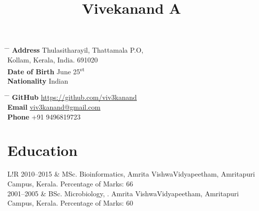 \documentclass[a4paper, 10pt]{article}
\date{\vspace{-10ex}}
\newcommand\VRule{\color{lightgray}\vrule width 0.5pt}
\begin{document}
\title{\vspace{-12ex}Vivekanand A}

\maketitle

\parbox[t]{0.5\textwidth}{
\begin{tabbing}
\hspace{3cm} \= \hspace{4cm} \= \kill
{\bf Address} \> Thulasitharayil, Thattamala P.O,\\
\> Kollam, Kerala, India. 691020 \\
{\bf Date of Birth}  June 25\textsuperscript{st} \\
{\bf Nationality} \> Indian \\
\end{tabbing}
}
\hfil
\parbox[t]{0.5\textwidth}{
\begin{tabbing}
\hspace{2cm} \= \hspace{4cm} \= \kill
{\bf GitHub} \> \href{https://github.com/viv3kanand}{https://github.com/viv3kanand} \\
{\bf Email} \> \href{mailto:viv3kanand@gmail.com}{viv3kanand@gmail.com} \\
{\bf Phone} \> +91 9496819723
\end{tabbing}
}



\section*{Education}
\begin{tabular}{L!{\VRule}R}
   2010--2015 & MSc. Bioinformatics, Amrita VishwaVidyapeetham, Amritapuri Campus, Kerala. Percentage of Marks: 66 \\
   2001--2005 & BSc. Microbiology, . Amrita VishwaVidyapeetham, Amritapuri Campus, Kerala. Percentage of Marks: 60 \\
\end{tabular}
\end{document}
